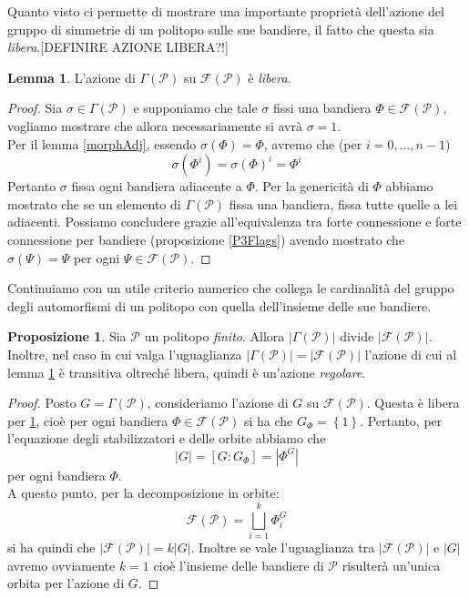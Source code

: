 \documentclass[a4paper,12pt]{report}
\newcommand{\p}{\mathcal{P}}
\theoremstyle{plain}
\theoremstyle{definition}
\newtheorem{lem}[teo]{Lemma}
\newtheorem{prop}[teo]{Proposizione}
\begin{document}
Quanto visto ci permette di mostrare una importante propriet\`a dell'azione del gruppo di simmetrie di un politopo sulle sue bandiere, il fatto
che questa sia \emph{libera}.[DEFINIRE AZIONE LIBERA?!]
\begin{lem}
\label{freeAction}
L'azione di $\Gamma(\p)$ su $\mathcal{F}(\p)$ \`e \emph{libera}.
\end{lem}
\begin{proof}
Sia $\sigma\in\Gamma(\p)$ e supponiamo che tale $\sigma$ fissi una bandiera $\Phi\in\mathcal{F}(\p)$, vogliamo mostrare che allora necessariamente
si avr\`a $\sigma=1$.\\
Per il lemma \ref{morphAdj}, essendo $\sigma(\Phi)=\Phi$, avremo che (per $i=0,\dots,n-1$)
\begin{equation*}
\sigma(\Phi^i)=\sigma(\Phi)^i=\Phi^i
\end{equation*}
Pertanto $\sigma$ fissa ogni bandiera adiacente a $\Phi$. Per la genericit\`a di $\Phi$ abbiamo mostrato che se un elemento di $\Gamma(\p)$ fissa una
bandiera, fissa tutte quelle a lei adiacenti. Possiamo concludere grazie all'equivalenza tra forte connessione e forte connessione per bandiere
(proposizione \ref{P3Flags}) avendo mostrato che $\sigma(\Psi)=\Psi$ per ogni $\Psi\in\mathcal{F}(\p)$.
\end{proof}
Continuiamo con un utile criterio numerico che collega le cardinalit\`a del gruppo degli automorfismi di un politopo con quella dell'insieme delle sue
bandiere.
\begin{prop}
\label{regularAction}
Sia $\p$ un politopo \emph{finito}. Allora $\left|\Gamma(\p)\right|$ divide $\left|\mathcal{F}(\p)\right|$. Inoltre, nel caso in cui valga l'uguaglianza
$\left|\Gamma(\p)\right|=\left|\mathcal{F}(\p)\right|$ l'azione di cui al lemma \ref{freeAction} \`e transitiva oltrech\'e libera, quindi 
\`e un'azione \emph{regolare}.
\end{prop}
\begin{proof}
Posto $G=\Gamma(\p)$, consideriamo l'azione di $G$ su $\mathcal{F}(\p)$. Questa \`e libera per \ref{freeAction}, cio\`e per ogni bandiera
$\Phi\in\mathcal{F}(\p)$ si ha che $G_\Phi=\left\{1\right\}$. Pertanto, per l'equazione degli stabilizzatori e delle orbite abbiamo che
\begin{equation*}
\left|G\right|=[G:G_\Phi]=\left|\Phi^G\right|
\end{equation*}
per ogni bandiera $\Phi$.\\
A questo punto, per la decomposizione in orbite:
\begin{equation*}
\mathcal{F}(\p)=\bigsqcup_{i=1}^k \Phi_i^G
\end{equation*}
si ha quindi che $\left|\mathcal{F}(\p)\right|=k\left|G\right|$. Inoltre se vale l'uguaglianza tra $\left|\mathcal{F}(\p)\right|$ e $\left|G\right|$
avremo ovviamente $k=1$ cio\`e l'insieme delle bandiere di $\p$ risulter\`a un'unica orbita per l'azione di $G$.
\end{proof}
\end{document}
